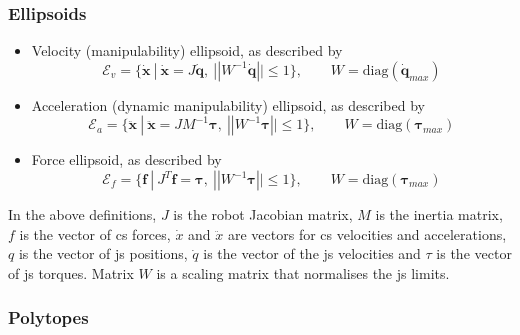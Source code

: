 \subsubsection*{Ellipsoids}
\begin{itemize}
\itemindent=-13pt
\item  Velocity (manipulability) ellipsoid, as described by \citet{yoshikawa1985manipulability} 
\begin{equation}\label{eq:ev_r}
\mathcal{E}_{v} = \{\dot{\bm{x}} ~| ~\dot{\bm{x}} = J\dot{\bm{q}},~ ||W^{-1}\dot{\bm{q}}||\leq1 \}, \qquad W = \text{diag}(\dot{\bm{q}}_{max})
\end{equation}
\item  Acceleration (dynamic manipulability) ellipsoid, as described by \citet{chiacchio_2000}
\begin{equation}\label{eq:ea_r}
\mathcal{E}_{a} = \{\ddot{\bm{x}} ~| ~\ddot{\bm{x}} = JM^{-1}\bm{\tau},~ ||W^{-1}\bm{\tau}||\leq1 \}, \qquad W = \text{diag}(\bm{\tau}_{max})
\end{equation}
\item  Force ellipsoid, as described by \citet{Chiacchio1997Force}
\begin{equation}\label{eq:ef_r}
\mathcal{E}_{f} = \{\bm{f} ~| ~J^{T}\bm{f} = \bm{\tau},~ ||W^{-1}\bm{\tau}||\leq1 \}, \qquad W = \text{diag}(\bm{\tau}_{max})
\end{equation}
\end{itemize}

In the above definitions, $J$ is the robot Jacobian matrix, $M$ is the inertia matrix, $f$ is the vector of \gls{cs} forces, $\dot{x}$ and $\ddot{x}$ are vectors for \gls{cs} velocities and accelerations, $q$ is the vector of \gls{js} positions, $\dot{q}$ is the vector of the \gls{js} velocities and $\tau$ is the vector of \gls{js} torques. Matrix $W$ is a scaling matrix that normalises the \gls{js} limits.

\subsubsection*{Polytopes}

